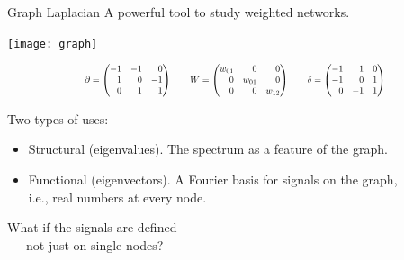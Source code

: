 \documentclass[10pt,t]{beamer} %
\begin{document}
\begin{frame}{Graph Laplacian}
	A powerful tool to study weighted networks. 
	
	\vskip 5pt
	\pause
	
	\begin{center}
		\texttt{[image: graph]}
	\end{center}
	
	\vskip -5pt
	
	\begin{equation*}
	\resizebox{8.5cm}{!}{
		$\partial =
		\begin{pmatrix*}[r]
		-1 & -1 &  0 \\
		 1 &  0 & -1 \\
		 0 &  1 &  1
		\end{pmatrix*}
		\qquad
		W =
		\begin{pmatrix*}[r]
		w_{01}& 0      & 0 \\
		0     & w_{01} & 0 \\
		0     &      0 & w_{12}
		\end{pmatrix*}
		\qquad
		\delta =
		\begin{pmatrix*}[r]
		-1 &  1 & 0 \\
		-1 &  0 & 1 \\
		 0 & -1 & 1
		\end{pmatrix*}$}
	\end{equation*}
		
	\vskip 10pt
	\pause
	
	Two types of uses:
	\begin{itemize}
		\item[] \textcolor{pblue}{Structural (eigenvalues).}	The spectrum as a feature of the graph.
		
		\pause
		
		\item[] \textcolor{pblue}{Functional (eigenvectors).} A Fourier basis for signals on the graph, \\ 
		
		\vskip 5pt
		\hspace*{5cm} \pause i.e., real numbers at every node.
	\end{itemize}

	\pause
	
	What if the signals are defined \\
	\textcolor{pblue}{\ \ \ not just on single nodes?}
\end{frame}
\end{document}

